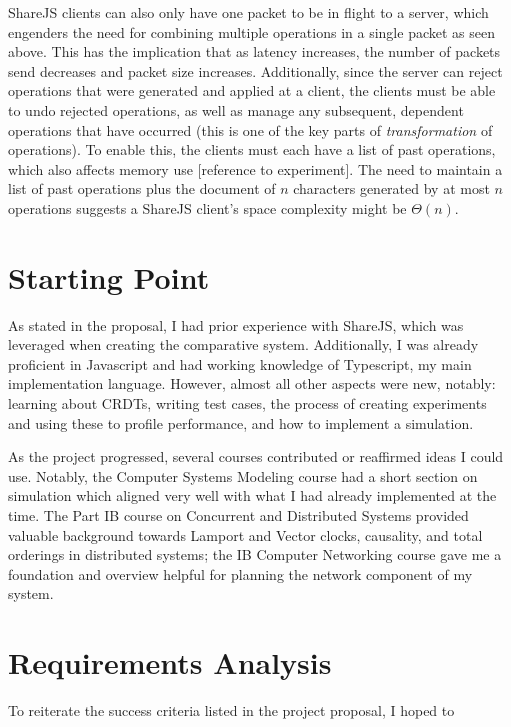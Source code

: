\documentclass[12pt,a4paper,twoside,openright]{report}
\begin{document}
	ShareJS clients can also only have one packet to be in flight to a server, which engenders the need for combining multiple operations in a single packet as seen above. This has the implication that as latency increases, the number of packets send decreases and packet size increases. Additionally, since the server can reject operations that were generated and applied at a client, the clients must be able to undo rejected operations, as well as manage any subsequent, dependent operations that have occurred (this is one of the key parts of \textit{transformation} of operations). To enable this, the clients must each have a list of past operations, which also affects memory use [reference to experiment]. The need to maintain a list of past operations plus the document of $n$ characters generated by at most $n$ operations suggests a ShareJS client's space complexity might be $\Theta (n)$.

	
\section{Starting Point}

As stated in the proposal, I had prior experience with ShareJS, which was leveraged when creating the comparative system. Additionally, I was already proficient in Javascript and had working knowledge of Typescript, my main implementation language. However, almost all other aspects were new, notably: learning about CRDTs, writing test cases, the process of creating experiments and using these to profile performance, and how to implement a simulation.

As the project progressed, several courses contributed or reaffirmed ideas I could use. Notably, the Computer Systems Modeling \cite{compsysmodeling} course had a short section on simulation which aligned very well with what I had already implemented at the time. The Part IB course on Concurrent and Distributed Systems \cite{concdistsystems} provided valuable background towards Lamport and Vector clocks, causality, and total orderings in distributed systems; the IB Computer Networking course \cite{computernetworking} gave me a foundation and overview helpful for planning the network component of my system.



\section{Requirements Analysis}
To reiterate the success criteria listed in the project proposal, I hoped to
\end{document}
